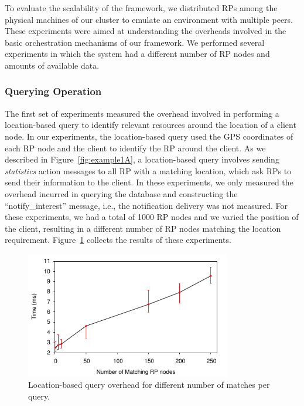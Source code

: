 To evaluate the scalability of the framework, we distributed RPs among the physical machines of our cluster to emulate an environment with multiple peers. These experiments were aimed at understanding the overheads involved in the basic orchestration mechanisms of our framework. We performed several experiments in which the system had a different number of RP nodes and amounts of available data.

\subsubsection{Querying Operation}

The first set of experiments measured the overhead involved in performing a location-based query to identify relevant resources around the location of a client node. In our experiments, the location-based query used the GPS coordinates of each RP node and the client to identify the RP around the client.
As we described in Figure~\ref{fig:example1A}, a location-based query involves sending {\it statistics} action messages to all RP with a matching location, which ask RPs to send their information to the client. In these experiments, we only measured the overhead incurred in querying the database and constructing the ``notify\_interest'' message, i.e., the notification delivery was not measured. For these experiments, we had a total of 1000 RP nodes and we varied the position of the client, resulting in a different number of RP nodes matching the location requirement. Figure~\ref{fig:matching} collects the results of these experiments.

\begin{figure}[htb!]
  \centering
    \includegraphics[width=0.8\textwidth]{Figures/locationQuery.pdf}
  \caption{Location-based query overhead for different number of matches per query.} \label{fig:matching}
\end{figure}

